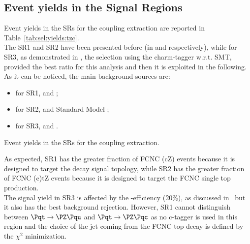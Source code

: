 \subsection{Event yields in the Signal Regions}
Event yields in the SRs for the \tZc coupling extraction are reported in Table~\ref{tab:sel:yields:tzc}.\\
The SR1 and SR2 have been presented before (in  and  respectively),
while for SR3, as demonstrated in , the selection using the charm-tagger \DLrc
w.r.t. SMT, provided the best \ssplusb ratio for this analysis and then it is exploited in the following.\\
As it can be noticed, the main background sources are:
\begin{itemize}
	\item for SR1\tZc, \ttZ and \VVHF;
	\item for SR2\tZc, \VVHF and Standard Model \tZq ;
	\item for SR3\tZc, \ttZ and \VVHF .
\end{itemize}

\begin{table}[!htbp]
	\centering
	\small
	
	\caption{Event yields in the SRs for the \tZc coupling extraction. \TabErrStatOnly} 
	\label{tab:sel:yields:tzc}
\end{table} 
\noindent As expected, SR1 has the greater fraction of FCNC \ttbar(cZ) events because it is designed to target the decay signal topology, while SR2 has the greater fraction of FCNC (c)tZ events because it is designed to target the FCNC single top production.\\
The signal yield in SR3 is affected by the \DLrc  \Pqc-efficiency (20\%), as discussed in~ but it also has the best background rejection. However, SR1 cannot distinguish between $\mathrm{\Pqt\rightarrow\PZ\Pqu}$ and $\mathrm{\Pqt\rightarrow\PZ\Pqc}$ as no c-tagger is used in this region and the choice of the jet coming from the FCNC top decay is defined by the $\chi^2$ minimization.

\clearpage
